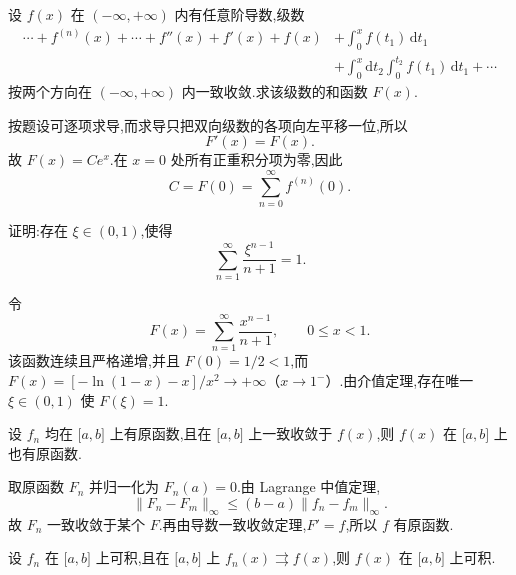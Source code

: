 \begin{example}
    设 $f(x)$ 在 $(-\infty,+\infty)$ 内有任意阶导数,级数
    \[
        \begin{aligned}
            \cdots+f^{(n)}(x)+\cdots+f''(x)+f'(x)+f(x)
             & +\int_0^xf(t_1)\,\mathrm{d}t_1                                 \\
             & +\int_0^x\mathrm{d}t_2\int_0^{t_2}f(t_1)\,\mathrm{d}t_1+\cdots
        \end{aligned}
    \]
    按两个方向在 $(-\infty,+\infty)$ 内一致收敛.求该级数的和函数 $F(x)$.
\end{example}
\exampleblank

\begin{solution}
    按题设可逐项求导,而求导只把双向级数的各项向左平移一位,所以
    \[
        F'(x)=F(x).
    \]
    故 $F(x)=Ce^x$.在 $x=0$ 处所有正重积分项为零,因此
    \[
        C=F(0)=\sum\limits_{n=0}^{\infty}f^{(n)}(0).
    \]
\end{solution}

\begin{example}
    证明:存在 $\xi\in(0,1)$,使得
    \[
        \sum\limits_{n=1}^{\infty}\dfrac{\xi^{n-1}}{n+1}=1.
    \]
\end{example}
\exampleblank

\begin{solution}
    令
    \[
        F(x)=\sum\limits_{n=1}^{\infty}\dfrac{x^{n-1}}{n+1},\qquad0\leq x<1.
    \]
    该函数连续且严格递增,并且 $F(0)=1/2<1$,而
    $F(x)=[-\ln(1-x)-x]/x^2\to+\infty$（$x\to1^-$）.由介值定理,存在唯一 $\xi\in(0,1)$ 使 $F(\xi)=1$.
\end{solution}

\begin{example}[\markstar]
    设 $f_n$ 均在 $\lbrack a,b\rbrack$ 上有原函数,且在 $\lbrack a,b\rbrack$ 上一致收敛于 $f(x)$,则 $f(x)$ 在 $\lbrack a,b\rbrack$ 上也有原函数.
\end{example}
\exampleblank

\begin{solution}
    取原函数 $F_n$ 并归一化为 $F_n(a)=0$.由 Lagrange 中值定理,
    \[
        \|F_n-F_m\|_\infty\leq(b-a)\|f_n-f_m\|_\infty.
    \]
    故 $F_n$ 一致收敛于某个 $F$.再由导数一致收敛定理,$F'=f$,所以 $f$ 有原函数.
\end{solution}

\begin{example}[\markstar]
    设 $f_n$ 在 $\lbrack a,b\rbrack$ 上可积,且在 $\lbrack a,b\rbrack$ 上 $f_n(x)\rightrightarrows f(x)$,则 $f(x)$ 在 $\lbrack a,b\rbrack$ 上可积.
\end{example}
\exampleblank

